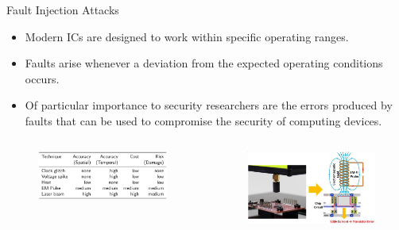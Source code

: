 \documentclass[handout]{beamer}
\begin{document}
\begin{frame}{Fault Injection Attacks}

\begin{itemize}
\footnotesize

\item Modern ICs are designed to work within specific operating ranges.

\vspace{10pt}

\item Faults arise whenever a deviation from the expected operating conditions occurs.

\vspace{10pt}

\item Of particular importance to security researchers are the errors produced by faults that can be used to compromise the security of computing devices.

\end{itemize}


\begin{columns}


\begin{figure}
\includegraphics[width=170pt]{figures/fault-injection-techiques.png}
\end{figure}


\begin{figure}
\includegraphics[width=170pt]{figures/Principle-of-electromagnetic-fault-injection.jpg}
\end{figure}

\end{columns}


\end{frame}
\end{document}
